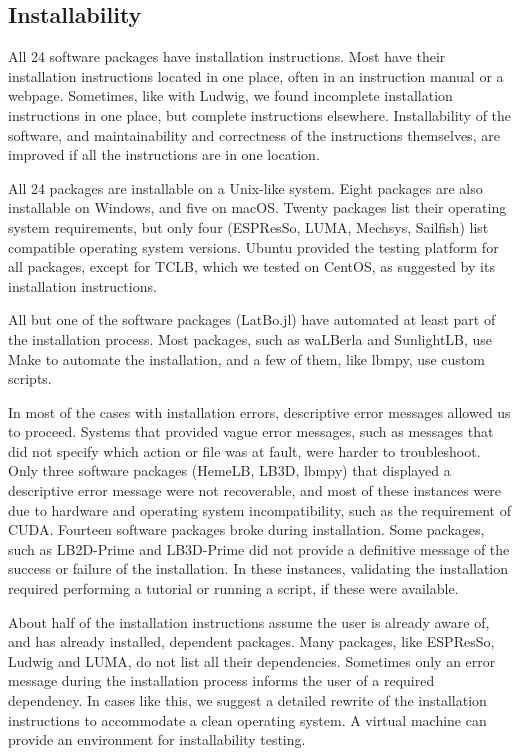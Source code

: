 \documentclass[final, 3p, times, authoryear]{elsarticle}
\newcommand{\esp}{ESPResSo\nolinebreak\hspace{-.05em}\raisebox{.4ex}{\small\bf
+}\nolinebreak\hspace{-.10em}\raisebox{.4ex}{\small\bf +}}
\begin{document}
\subsection{Installability}

All 24 software packages have installation instructions. Most have their
installation instructions located in one place, often in an instruction manual
or a webpage. Sometimes, like with Ludwig, we found incomplete installation
instructions in one place, but complete instructions elsewhere. Installability
of the software, and maintainability and correctness of the instructions
themselves, are improved if all the instructions are in one location.

All 24 packages are installable on a Unix-like system. Eight packages are also
installable on Windows, and five on macOS. Twenty packages list their operating
system requirements, but only four (ESPResSo, LUMA, Mechsys, Sailfish) list
compatible operating system versions. Ubuntu provided the testing platform for
all packages, except for TCLB, which we tested on CentOS, as suggested by its
installation instructions. 

All but one of the software packages (LatBo.jl) have automated at least part of
the installation process. Most packages, such as waLBerla and SunlightLB, use
Make to automate the installation, and a few of them, like lbmpy, use custom
scripts.

In most of the cases with installation errors, descriptive error messages
allowed us to proceed. Systems that provided vague error messages, such as
messages that did not specify which action or file was at fault, were harder to
troubleshoot. Only three software packages (HemeLB, LB3D, lbmpy) that displayed
a descriptive error message were not recoverable, and most of these instances
were due to hardware and operating system incompatibility, such as the
requirement of CUDA. Fourteen software packages broke during installation. Some
packages, such as LB2D-Prime and LB3D-Prime did not provide a definitive message
of the success or failure of the installation. In these instances, validating
the installation required performing a tutorial or running a script, if these
were available. 

About half of the installation instructions assume the user is already aware of,
and has already installed, dependent packages. Many packages, like \esp, Ludwig
and LUMA, do not list all their dependencies. Sometimes only an error message
during the installation process informs the user of a required dependency. In
cases like this, we suggest a detailed rewrite of the installation instructions
to accommodate a clean operating system. A virtual machine can provide an
environment for installability testing.
\end{document}
